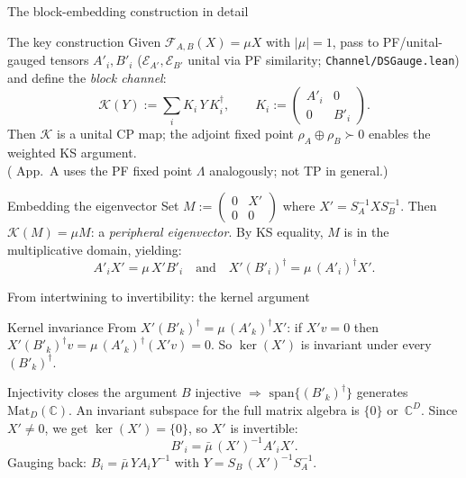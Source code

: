 \documentclass[aspectratio=169,10pt]{beamer}
\newcommand{\Mat}{\mathrm{Mat}}
\newcommand{\cE}{\mathcal{E}}
\newcommand{\cF}{\mathcal{F}}
\newcommand{\Span}{\mathrm{span}}
\begin{document}
\begin{frame}{The block-embedding construction in detail}
    \vspace{-0.6em}

    \begin{block}{The key construction}
        Given $\cF_{A,B}(X) = \mu X$ with $|\mu|=1$, pass to PF/unital-gauged tensors
        $A'_i, B'_i$ ($\cE_{A'},\cE_{B'}$ unital via PF similarity; \texttt{Channel/DSGauge.lean})
        and define the \emph{block channel}:
        \[
            \mathcal{K}(Y) := \sum_{i} K_i\, Y\, K_i^\dagger, \qquad
            K_i := \begin{pmatrix} A'_i & 0 \\ 0 & B'_i \end{pmatrix}.
        \]
        Then $\mathcal{K}$ is a \alert{unital} CP map; the adjoint fixed point $\rho_A\oplus\rho_B\succ 0$
        enables the weighted KS argument.\\
        \textcolor{dimwhite}{\footnotesize (\cite{Cirac2017Annals} App.~A uses the PF fixed point $\Lambda$ analogously; not TP in general.)}
    \end{block}

    \begin{block}{Embedding the eigenvector}
        Set $M := (\begin{smallmatrix} 0 & X' \\ 0 & 0 \end{smallmatrix})$
        where $X' = S_A^{-1} X S_B^{-1}$.
        Then $\mathcal{K}(M) = \mu M$: a \emph{peripheral eigenvector}.
        By KS equality, $M$ is in the multiplicative domain, yielding:
        \[
            A'_i X' = \mu\, X' B'_i \quad \text{and} \quad
            X' (B'_i)^\dagger = \mu\, (A'_i)^\dagger X'.
        \]
    \end{block}
\end{frame}

\begin{frame}{From intertwining to invertibility: the kernel argument}
    \vspace{-0.6em}

    \begin{block}{Kernel invariance}
        From $X' (B'_k)^\dagger = \mu\,(A'_k)^\dagger X'$:
        if $X' v = 0$ then $X' (B'_k)^\dagger v = \mu\,(A'_k)^\dagger (X' v) = 0$.
        So \alert{$\ker(X')$ is invariant under every $(B'_k)^\dagger$}.
    \end{block}

    \begin{block}{Injectivity closes the argument}
        $B$ injective $\Rightarrow$ $\Span\{(B'_k)^\dagger\}$ generates $\Mat_D(\mathbb{C})$.
        An invariant subspace for the full matrix algebra is $\{0\}$ or~$\mathbb{C}^D$.
        Since $X'\neq 0$, we get $\ker(X')=\{0\}$, so $X'$ is invertible:
        \[
            B'_i = \bar\mu\,(X')^{-1}A'_i X'.
        \]
        Gauging back: $B_i = \bar\mu\, Y A_i Y^{-1}$ with $Y = S_B\,(X')^{-1} S_A^{-1}$.
    \end{block}
\end{frame}
\end{document}
